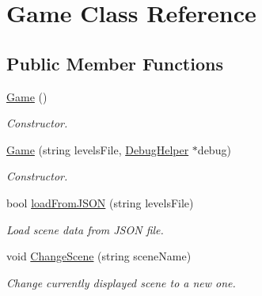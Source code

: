 \hypertarget{class_game}{}\section{Game Class Reference}
\label{class_game}
\subsection*{Public Member Functions}
\begin{DoxyCompactItemize}
\item 
\mbox{\label{class_game_ad59df6562a58a614fda24622d3715b65}} 
\mbox{\hyperlink{class_game_ad59df6562a58a614fda24622d3715b65}{Game}} ()
\begin{DoxyCompactList}\small\item\em Constructor. \end{DoxyCompactList}\item 
\mbox{\label{class_game_a4d40c0573774dd8f3334d7b568c00b5c}} 
\mbox{\hyperlink{class_game_a4d40c0573774dd8f3334d7b568c00b5c}{Game}} (string levels\+File, \mbox{\hyperlink{class_debug_helper}{Debug\+Helper}} $\ast$debug)
\begin{DoxyCompactList}\small\item\em Constructor. \end{DoxyCompactList}\item 
\mbox{\label{class_game_adc5df650d2425ea6c3be9c457af2b702}} 
bool \mbox{\hyperlink{class_game_adc5df650d2425ea6c3be9c457af2b702}{load\+From\+J\+S\+ON}} (string levels\+File)
\begin{DoxyCompactList}\small\item\em Load scene data from J\+S\+ON file. \end{DoxyCompactList}\item 
\mbox{\label{class_game_a2188abf2b6fe1782fd18609065f06948}} 
void \mbox{\hyperlink{class_game_a2188abf2b6fe1782fd18609065f06948}{Change\+Scene}} (string scene\+Name)
\begin{DoxyCompactList}\small\item\em Change currently displayed scene to a new one. \end{DoxyCompactList}\item 
\mbox{\label{class_game_a6f3a33940524b6ba9d83f627ccb14bbf}} 

\end{DoxyCompactItemize}
